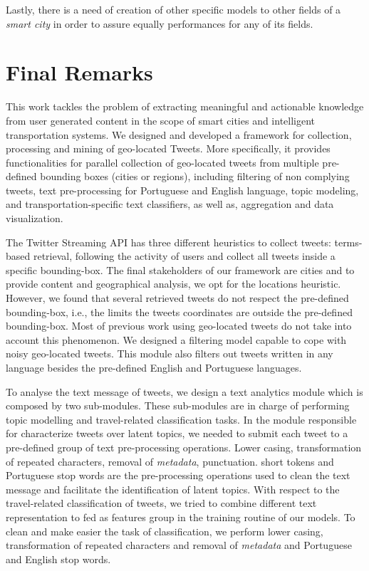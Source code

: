 Lastly, there is a need of creation of other specific models to other fields of a \textit{smart city} in order to assure equally performances for any of its fields.
\fi

\section{Final Remarks}

This work tackles the problem of extracting meaningful and actionable knowledge from user generated content in the scope of smart cities and intelligent transportation systems. We designed and developed a framework for collection, processing and mining of geo-located Tweets. More specifically, it provides functionalities for parallel collection of geo-located tweets from multiple pre-defined bounding boxes (cities or regions), including filtering of non complying tweets, text pre-processing for Portuguese and English language, topic modeling, and transportation-specific text classifiers, as well as, aggregation and data visualization.

The Twitter Streaming API has three different heuristics to collect tweets: terms-based retrieval, following the activity of users and collect all tweets inside a specific bounding-box. The final stakeholders of our framework are cities and to provide content and geographical analysis, we opt for the locations heuristic. However, we found that several retrieved tweets do not respect the pre-defined bounding-box, i.e., the limits the tweets coordinates are outside the pre-defined bounding-box. Most of previous work using geo-located tweets do not take into account this phenomenon. We designed a filtering model capable to cope with noisy geo-located tweets. This module also filters out tweets written in any language besides the pre-defined English and Portuguese languages.

To analyse the text message of tweets, we design a text analytics module which is composed by two sub-modules. These sub-modules are in charge of performing topic modelling and travel-related classification tasks. In the module responsible for characterize tweets over latent topics, we needed to submit each tweet to a pre-defined group of text pre-processing operations. Lower casing, transformation of repeated characters, removal of \textit{metadata}, punctuation. short tokens and Portuguese stop words are the pre-processing operations used to clean the text message and facilitate the identification of latent topics. With respect to the travel-related classification of tweets, we tried to combine different text representation to fed as features group in the training routine of our models. To clean and make easier the task of classification, we perform lower casing, transformation of repeated characters and removal of \textit{metadata} and Portuguese and English stop words. 

